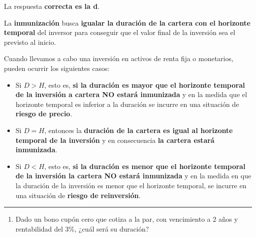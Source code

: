 \documentclass[
  letterpaper,
  DIV=11,
  numbers=noendperiod]{scrartcl}
\providecommand{\tightlist}{%
  \setlength{\itemsep}{0pt}\setlength{\parskip}{0pt}}\usepackage{longtable,booktabs,array}
\begin{document}
\begin{tcolorbox}[enhanced jigsaw, colframe=quarto-callout-note-color-frame, opacityback=0, colback=white, leftrule=.75mm, left=2mm, breakable, arc=.35mm, rightrule=.15mm, toprule=.15mm, bottomrule=.15mm]
\begin{minipage}[t]{5.5mm}
\textcolor{quarto-callout-note-color}{\faInfo}
\end{minipage}%
\begin{minipage}[t]{\textwidth - 5.5mm}

La respuesta \textbf{correcta es la d}.

La \textbf{inmunización} busca \textbf{igualar la duración de la cartera
con el horizonte temporal} del inversor para conseguir que el valor
final de la inversión sea el previsto al inicio.


Cuando llevamos a cabo una inversión en activos de renta fija o
monetarios, pueden ocurrir los siguientes casos:

\begin{itemize}
\item
  Si \(D > H\), esto es, \textbf{si la duración es mayor que el
  horizonte temporal de la inversión a cartera NO estará inmunizada} y
  en la medida que el horizonte temporal es inferior a la duración se
  incurre en una situación de \textbf{riesgo de precio}.
\item
  Si \(D = H\), entonces la \textbf{duración de la cartera es igual al
  horizonte temporal de la inversión} y en consecuencia \textbf{la
  cartera estará inmunizada}.
\item
  Si \(D < H\), esto es, \textbf{si la duración es menor que el
  horizonte temporal de la inversión la cartera NO estará inmunizada} y
  en la medida en que la duración de la inversión es menor que el
  horizonte temporal, se incurre en una situación de \textbf{riesgo de
  reinversión}.
\end{itemize}


\end{minipage}%
\end{tcolorbox}

\begin{center}\rule{0.5\linewidth}{0.5pt}\end{center}

\begin{enumerate}
\def\labelenumi{\arabic{enumi}.}
\setcounter{enumi}{1}
\tightlist
\item
  Dado un bono cupón cero que cotiza a la par, con vencimiento a 2 años
  y rentabilidad del 3\%, ¿cuál será su duración?
\end{enumerate}
\end{document}
